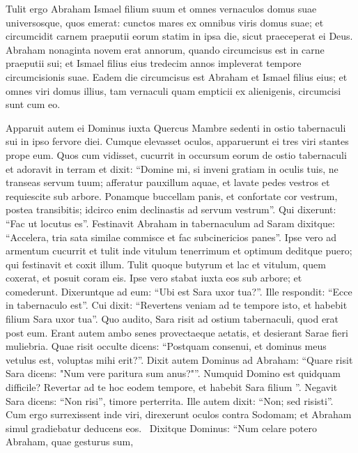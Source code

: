 \begin{biblechapter}
\begin{biblechapter}
\begin{biblechapter}
\begin{biblechapter}
\begin{biblechapter}
\begin{biblechapter}
\begin{biblechapter}
\begin{biblechapter}
\begin{biblechapter}
\begin{biblechapter}
\begin{biblechapter}
\begin{biblechapter}
\begin{biblechapter}
\begin{biblechapter}
\begin{biblechapter}
\begin{biblechapter}
\begin{biblechapter}
 \verse Tulit ergo Abraham Ismael filium suum et omnes vernaculos domus suae universosque, quos emerat: cunctos mares ex omnibus viris domus suae; et circumcidit carnem praeputii eorum statim in ipsa die, sicut praeceperat ei Deus. 
\verse Abraham nonaginta novem erat annorum, quando circumcisus est in carne praeputii sui; 
\verse et Ismael filius eius tredecim annos impleverat tempore circumcisionis suae. 
\verse Eadem die circumcisus est Abraham et Ismael filius eius; 
\verse et omnes viri domus illius, tam vernaculi quam empticii ex alienigenis, circumcisi sunt cum eo.
 
\begin{biblechapter}
\verse Apparuit autem ei Dominus iuxta Quercus Mambre sedenti in ostio tabernaculi sui in ipso fervore diei. 
\verse Cumque elevasset oculos, apparuerunt ei tres viri stantes prope eum. Quos cum vidisset, cucurrit in occursum eorum de ostio tabernaculi et adoravit in terram 
\verse et dixit: “Domine mi, si inveni gratiam in oculis tuis, ne transeas servum tuum; 
\verse afferatur pauxillum aquae, et lavate pedes vestros et requiescite sub arbore. 
\verse Ponamque buccellam panis, et confortate cor vestrum, postea transibitis; idcirco enim declinastis ad servum vestrum”. Qui dixerunt: “Fac ut locutus es”.
 \verse Festinavit Abraham in tabernaculum ad Saram dixitque: “Accelera, tria sata similae commisce et fac subcinericios panes”. 
\verse Ipse vero ad armentum cucurrit et tulit inde vitulum tenerrimum et optimum deditque puero; qui festinavit et coxit illum. 
\verse Tulit quoque butyrum et lac et vitulum, quem coxerat, et posuit coram eis. Ipse vero stabat iuxta eos sub arbore; et comederunt.
 \verse Dixeruntque ad eum: “Ubi est Sara uxor tua?”. Ille respondit: “Ecce in tabernaculo est”. 
\verse Cui dixit: “Revertens veniam ad te tempore isto, et habebit filium Sara uxor tua”. Quo audito, Sara risit ad ostium tabernaculi, quod erat post eum. 
\verse Erant autem ambo senes provectaeque aetatis, et desierant Sarae fieri muliebria. 
\verse Quae risit occulte dicens: “Postquam consenui, et dominus meus vetulus est, voluptas mihi erit?”. 
\verse Dixit autem Dominus ad Abraham: “Quare risit Sara dicens: "Num vere paritura sum anus?"”.
 \verse Numquid Domino est quidquam difficile? Revertar ad te hoc eodem tempore, et habebit Sara filium ”. 
\verse Negavit Sara dicens: “Non risi”, timore perterrita. Ille autem dixit: “Non; sed risisti”.
 \verse Cum ergo surrexissent inde viri, direxerunt oculos contra Sodomam; et Abraham simul gradiebatur deducens eos. 
 \verse Dixitque Dominus: “Num celare potero Abraham, quae gesturus sum, 

\end{biblechapter}
\end{biblechapter}
\end{biblechapter}
\end{biblechapter}
\end{biblechapter}
\end{biblechapter}
\end{biblechapter}
\end{biblechapter}
\end{biblechapter}
\end{biblechapter}
\end{biblechapter}
\end{biblechapter}
\end{biblechapter}
\end{biblechapter}
\end{biblechapter}
\end{biblechapter}
\end{biblechapter}
\end{biblechapter}
